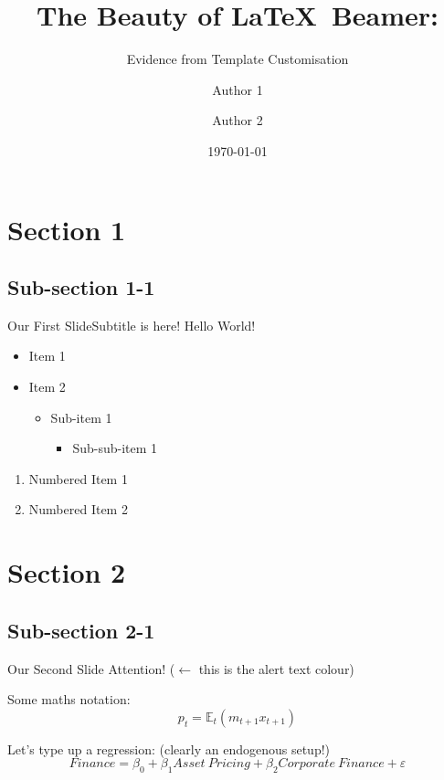 \documentclass[aspectratio=149]{beamer}
\title[footer text]{The Beauty of \LaTeX \ Beamer:}
\subtitle{Evidence from Template Customisation}
\author{Author 1 \inst{$^\dagger$} \and Author 2 \inst{$^\ddagger$}}
\institute{\inst{$^\dagger$} Institution 1 \and \inst{$^\ddagger$} Institution 2}
\date{\today}
\begin{document}
{
\begin{frame}[noframenumbering]
  \titlepage
\end{frame}
}




\section{Section 1}

\subsection{Sub-section 1-1}

\begin{frame}{Our First Slide}{Subtitle is here!}
  Hello World!
  \vspace{\baselineskip}


  \begin{itemize}
    \item Item 1
    \item Item 2
          \begin{itemize}
            \item Sub-item 1
                  \begin{itemize}
                    \item Sub-sub-item 1
                  \end{itemize}
          \end{itemize}
  \end{itemize}

  \vspace{4ex}

  \begin{enumerate}
    \item Numbered Item 1
    \item Numbered Item 2
  \end{enumerate}
\end{frame}

\section{Section 2}
\subsection{Sub-section 2-1}
\begin{frame}{Our Second Slide}
  \alert{Attention! ($\leftarrow$ this is the alert text colour)}
  \vspace{4ex}

  Some maths notation:
  $$ p_t=\mathbb{E}_t(m_{t+1}x_{t+1}) $$

  \hrulefill

  Let's type up a regression: (clearly an endogenous setup!)
  $$ Finance = \beta_0 + \beta_1Asset\ Pricing + \beta_2Corporate\
    Finance + \varepsilon $$


\end{frame}
\end{document}
